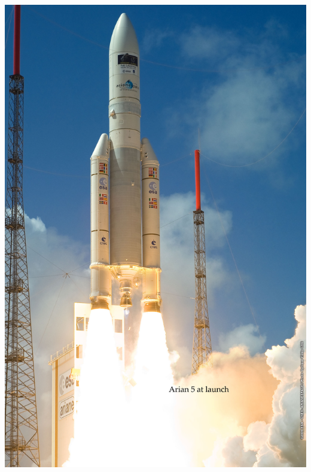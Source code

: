 \documentclass[sans, aspectratio=169]{beamer}
\begin{document}
\begin{frame}
\begin{columns}
\begin{column}{0.3\linewidth}
			\begin{flushright}
			\includegraphics[scale=0.3]{images/arian5.jpg} 
			\end{flushright}
			
		\end{column}
		
	\end{columns}
	
\end{frame}
\end{document}
